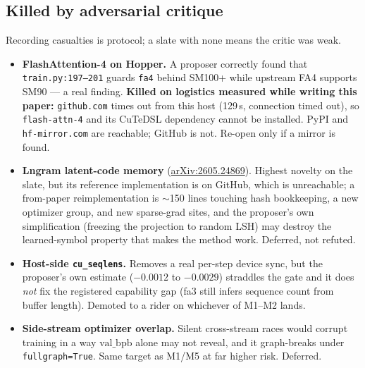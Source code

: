 \documentclass{article}
\newcommand{\vb}{\mathrm{val\_bpb}}
\begin{document}
\subsection{Killed by adversarial critique}
Recording casualties is protocol; a slate with none means the critic was weak.
\begin{itemize}\itemsep2pt
\item \textbf{FlashAttention-4 on Hopper.} A proposer correctly found that \texttt{train.py:197--201} guards \texttt{fa4} behind SM100+ while upstream FA4 supports SM90 --- a real finding. \textbf{Killed on logistics measured while writing this paper:} \texttt{github.com} times out from this host (129\,s, connection timed out), so \texttt{flash-attn-4} and its CuTeDSL dependency cannot be installed. PyPI and \texttt{hf-mirror.com} are reachable; GitHub is not. Re-open only if a mirror is found.
\item \textbf{Lngram latent-code memory} (\href{https://arxiv.org/abs/2605.24869}{arXiv:2605.24869}). Highest novelty on the slate, but its reference implementation is on GitHub, which is unreachable; a from-paper reimplementation is $\sim$150 lines touching hash bookkeeping, a new optimizer group, and new sparse-grad sites, and the proposer's own simplification (freezing the projection to random LSH) may destroy the learned-symbol property that makes the method work. Deferred, not refuted.
\item \textbf{Host-side \texttt{cu\_seqlens}.} Removes a real per-step device sync, but the proposer's own estimate ($-0.0012$ to $-0.0029$) straddles the gate and it does \emph{not} fix the registered capability gap (fa3 still infers sequence count from buffer length). Demoted to a rider on whichever of M1--M2 lands.
\item \textbf{Side-stream optimizer overlap.} Silent cross-stream races would corrupt training in a way $\vb$ alone may not reveal, and it graph-breaks under \texttt{fullgraph=True}. Same target as M1/M5 at far higher risk. Deferred.
\end{itemize}
\end{document}
